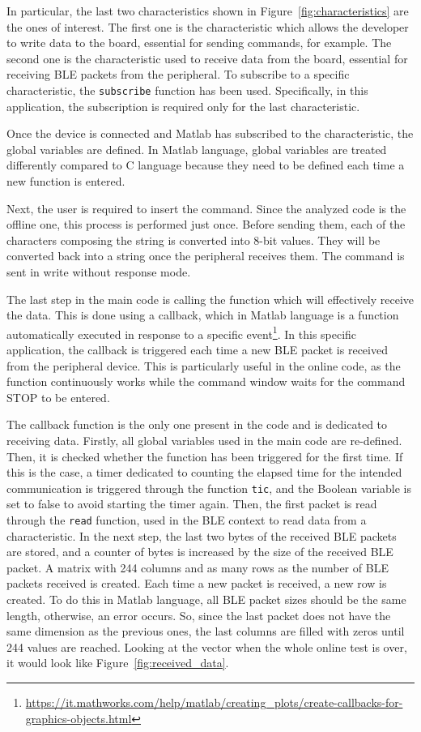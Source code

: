 \documentclass{Configuration_Files/PoliMi3i_thesis}
\begin{document}
In particular, the last two characteristics shown in Figure~\ref{fig:characteristics} are the ones of interest. The first one is the characteristic which allows the developer to write data to the board, essential for sending commands, for example. The second one is the characteristic used to receive data from the board, essential for receiving BLE packets from the peripheral. To subscribe to a specific characteristic, the \texttt{subscribe} function has been used. Specifically, in this application, the subscription is required only for the last characteristic.

Once the device is connected and Matlab has subscribed to the characteristic, the global variables are defined. In Matlab language, global variables are treated differently compared to C language because they need to be defined each time a new function is entered.

Next, the user is required to insert the command. Since the analyzed code is the offline one, this process is performed just once. Before sending them, each of the characters composing the string is converted into 8-bit values. They will be converted back into a string once the peripheral receives them. The command is sent in write without response mode.

The last step in the main code is calling the function which will effectively receive the data. This is done using a callback, which in Matlab language is a function automatically executed in response to a specific event\footnote{\url{https://it.mathworks.com/help/matlab/creating_plots/create-callbacks-for-graphics-objects.html}}. In this specific application, the callback is triggered each time a new BLE packet is received from the peripheral device. This is particularly useful in the online code, as the function continuously works while the command window waits for the command STOP to be entered.

The callback function is the only one present in the code and is dedicated to receiving data. Firstly, all global variables used in the main code are re-defined. Then, it is checked whether the function has been triggered for the first time. If this is the case, a timer dedicated to counting the elapsed time for the intended communication is triggered through the function \texttt{tic}, and the Boolean variable is set to false to avoid starting the timer again. Then, the first packet is read through the \texttt{read} function, used in the BLE context to read data from a characteristic. In the next step, the last two bytes of the received BLE packets are stored, and a counter of bytes is increased by the size of the received BLE packet. A matrix with 244 columns and as many rows as the number of BLE packets received is created. Each time a new packet is received, a new row is created. To do this in Matlab language, all BLE packet sizes should be the same length, otherwise, an error occurs. So, since the last packet does not have the same dimension as the previous ones, the last columns are filled with zeros until 244 values are reached. Looking at the vector when the whole online test is over, it would look like Figure~\ref{fig:received_data}.
\end{document}

